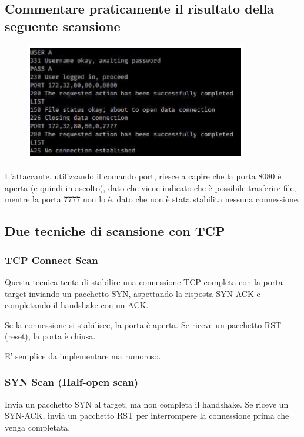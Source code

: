 \documentclass{report}
\begin{document}
\subsection{Commentare praticamente il risultato della seguente scansione}

\begin{figure}[H]
    \centering
    \includegraphics[width=1\linewidth]{images/scansione.png}
\end{figure}
L'attaccante, utilizzando il comando port, riesce a capire che la porta 8080 è aperta (e quindi in ascolto), dato che viene indicato che è possibile trasferire file, mentre la porta 7777 non lo è, dato che non è stata stabilita nessuna connessione.

\subsection{Due tecniche di scansione con TCP}
\subsubsection{TCP Connect Scan}
Questa tecnica tenta di stabilire una connessione TCP completa con la porta target inviando un pacchetto SYN, aspettando la risposta SYN-ACK e completando il handshake con un ACK.

\noindent Se la connessione si stabilisce, la porta è aperta.
Se riceve un pacchetto RST (reset), la porta è chiusa.

\noindent E' semplice da implementare ma rumoroso.

\subsubsection{SYN Scan (Half-open scan)}
Invia un pacchetto SYN al target, ma non completa il handshake. Se riceve un SYN-ACK, invia un pacchetto RST per interrompere la connessione prima che venga completata.
\end{document}
